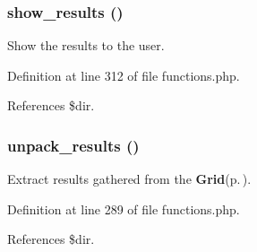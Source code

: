 \subsubsection{\setlength{\rightskip}{0pt plus 5cm}show\_\-results ()}\label{functions_8php_a8}


Show the results to the user. 



Definition at line 312 of file functions.php.

References \$dir.
\subsubsection{\setlength{\rightskip}{0pt plus 5cm}unpack\_\-results ()}\label{functions_8php_a7}


Extract results gathered from the {\bf Grid}{\rm (p.\,\pageref{classGrid})}. 



Definition at line 289 of file functions.php.

References \$dir.